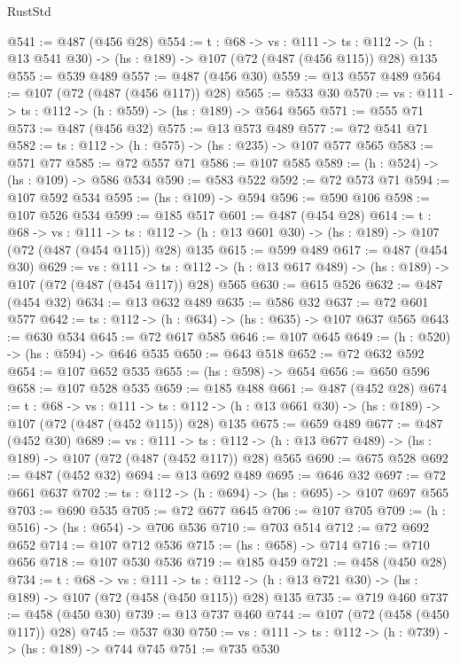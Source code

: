 \begin{lexlean}{RustStd}
\begin{coremodule}
@541 := @487 (@456 @28)
@554 := {t : @68} ->
  {vs : @111} ->
  {ts : @112} -> (h : @13 @541 @30) -> (hs : @189) -> @107 (@72 (@487 (@456 @115)) @28) @135
@555 := @539 @489
@557 := @487 (@456 @30)
@559 := @13 @557 @489
@564 := @107 (@72 (@487 (@456 @117)) @28)
@565 := @533 @30
@570 := {vs : @111} -> {ts : @112} -> (h : @559) -> (hs : @189) -> @564 @565
@571 := @555 @71
@573 := @487 (@456 @32)
@575 := @13 @573 @489
@577 := @72 @541 @71
@582 := {ts : @112} -> (h : @575) -> (hs : @235) -> @107 @577 @565
@583 := @571 @77
@585 := @72 @557 @71
@586 := @107 @585
@589 := (h : @524) -> (hs : @109) -> @586 @534
@590 := @583 @522
@592 := @72 @573 @71
@594 := @107 @592 @534
@595 := (hs : @109) -> @594
@596 := @590 @106
@598 := @107 @526 @534
@599 := @185 @517
@601 := @487 (@454 @28)
@614 := {t : @68} ->
  {vs : @111} ->
  {ts : @112} -> (h : @13 @601 @30) -> (hs : @189) -> @107 (@72 (@487 (@454 @115)) @28) @135
@615 := @599 @489
@617 := @487 (@454 @30)
@629 := {vs : @111} ->
  {ts : @112} -> (h : @13 @617 @489) -> (hs : @189) -> @107 (@72 (@487 (@454 @117)) @28) @565
@630 := @615 @526
@632 := @487 (@454 @32)
@634 := @13 @632 @489
@635 := @586 @32
@637 := @72 @601 @577
@642 := {ts : @112} -> (h : @634) -> (hs : @635) -> @107 @637 @565
@643 := @630 @534
@645 := @72 @617 @585
@646 := @107 @645
@649 := (h : @520) -> (hs : @594) -> @646 @535
@650 := @643 @518
@652 := @72 @632 @592
@654 := @107 @652 @535
@655 := (hs : @598) -> @654
@656 := @650 @596
@658 := @107 @528 @535
@659 := @185 @488
@661 := @487 (@452 @28)
@674 := {t : @68} ->
  {vs : @111} ->
  {ts : @112} -> (h : @13 @661 @30) -> (hs : @189) -> @107 (@72 (@487 (@452 @115)) @28) @135
@675 := @659 @489
@677 := @487 (@452 @30)
@689 := {vs : @111} ->
  {ts : @112} -> (h : @13 @677 @489) -> (hs : @189) -> @107 (@72 (@487 (@452 @117)) @28) @565
@690 := @675 @528
@692 := @487 (@452 @32)
@694 := @13 @692 @489
@695 := @646 @32
@697 := @72 @661 @637
@702 := {ts : @112} -> (h : @694) -> (hs : @695) -> @107 @697 @565
@703 := @690 @535
@705 := @72 @677 @645
@706 := @107 @705
@709 := (h : @516) -> (hs : @654) -> @706 @536
@710 := @703 @514
@712 := @72 @692 @652
@714 := @107 @712 @536
@715 := (hs : @658) -> @714
@716 := @710 @656
@718 := @107 @530 @536
@719 := @185 @459
@721 := @458 (@450 @28)
@734 := {t : @68} ->
  {vs : @111} ->
  {ts : @112} -> (h : @13 @721 @30) -> (hs : @189) -> @107 (@72 (@458 (@450 @115)) @28) @135
@735 := @719 @460
@737 := @458 (@450 @30)
@739 := @13 @737 @460
@744 := @107 (@72 (@458 (@450 @117)) @28)
@745 := @537 @30
@750 := {vs : @111} -> {ts : @112} -> (h : @739) -> (hs : @189) -> @744 @745
@751 := @735 @530

\end{coremodule}
\end{lexlean}
